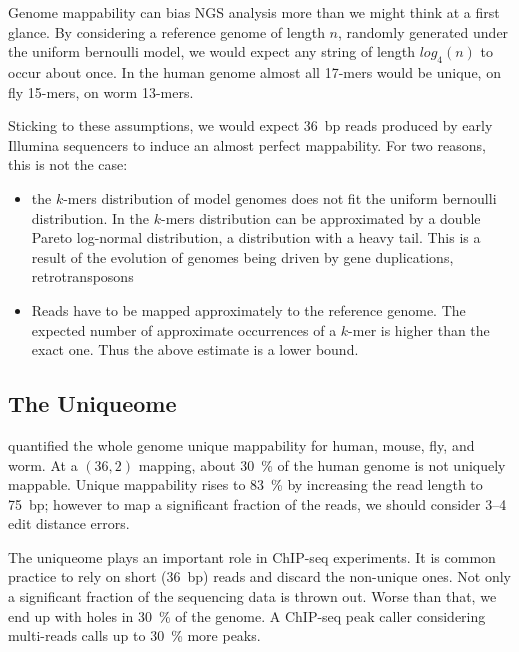 Genome mappability can bias NGS analysis more than we might think at a first glance.
By considering a reference genome of length $n$, randomly generated under the uniform bernoulli model, we would expect any string of length $log_4(n)$ to occur about once.
In the human genome almost all 17-mers would be unique, on fly 15-mers, on worm 13-mers.

Sticking to these assumptions, we would expect 36~bp reads produced by early Illumina sequencers to induce an almost perfect mappability. For two reasons, this is not the case:
\begin{itemize}
\item the $k$-mers distribution of model genomes does not fit the uniform bernoulli distribution.
In \citep{?} the $k$-mers distribution can be approximated by a double Pareto log-normal distribution, \ie a distribution with a heavy tail.
This is a result of the evolution of genomes being driven by gene duplications, retrotransposons \citep{?}

\item Reads have to be mapped approximately to the reference genome.
The expected number of approximate occurrences of a $k$-mer is higher than the exact one.
Thus the above estimate is a lower bound.
\end{itemize}


\subsection{The Uniqueome}

\citep{Derrien2012} quantified the whole genome unique mappability for human, mouse, fly, and worm.
At a $(36,2)$ mapping, about 30~\% of the human genome is not uniquely mappable.
Unique mappability rises to 83~\% by increasing the read length to 75~bp; however to map a significant fraction of the reads, we should consider 3--4 edit distance errors.

\begin{center}

\end{center}

The uniqueome plays an important role in ChIP-seq experiments.
It is common practice \citep{?} to rely on short (36~bp) reads and discard the non-unique ones.
Not only a significant fraction of the sequencing data is thrown out.
Worse than that, we end up with holes in 30~\% of the genome.
A ChIP-seq peak caller considering multi-reads calls up to 30~\% more peaks.

